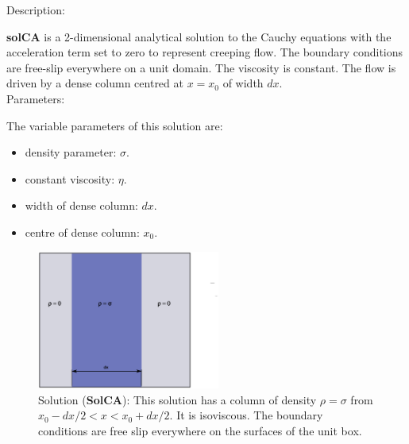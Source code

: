   {\large \fontB Description:}
  
  {\bf solCA} is a 2-dimensional analytical solution to the Cauchy equations with the acceleration term set to zero
  to represent creeping flow. The boundary conditions are free-slip everywhere on a unit domain. The viscosity is constant.
  The flow is driven by a dense column centred at $ x=x_0 $ of width $dx$.
  \\

 {\large \fontB Parameters:}
  
 The variable parameters of this solution are:
 \begin{itemize}
   \item{density parameter: $ \sigma $.}
   \item{constant viscosity: $\eta$.}
   \item{width of dense column: $dx$.}
   \item{centre of dense column: $x_0$.}

 \end{itemize}

  \begin{figure}
    \includegraphics[width=6cm,clip]{../figs/figCA.eps}
    \caption[Short caption]{\label{figCA} 
      Solution ({\bf SolCA}):
      This solution has a column of density $\rho = \sigma$ from $x_0-dx/2 < x < x_0+dx/2$.
      It is isoviscous.
      The boundary conditions are free slip everywhere on the surfaces of the unit box.}
  \end{figure} 
  

